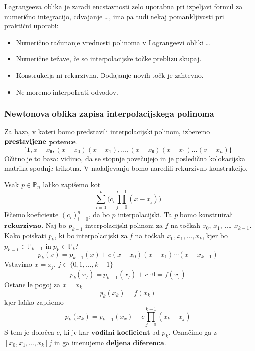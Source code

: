 \documentclass[a4paper,12pt]{article}
\theoremstyle{definition}
\theoremstyle{remark}
\newcommand{\Pp}{\mathbb{P}}
\begin{document}
Lagrangeeva oblika je zaradi enostavnosti zelo uporabna pri izpeljavi formul za numerično integracijo, odvajanje \dots, ima pa tudi nekaj pomankljivosti pri praktični uporabi:
\begin{itemize}
    \item Numerično računanje vrednosti polinoma v Lagrangeevi obliki \dots
    \item Numerične težave, če so interpolacijske točke preblizu skupaj.
    \item Konstrukcija ni rekurzivna. Dodajanje novih točk je zahtevno.
    \item Ne moremo interpolirati odvodov.
\end{itemize}

\subsubsection{Newtonova oblika zapisa interpolacijskega polinoma}
Za bazo, v kateri bomo predstavili interpolacijski polinom, izberemo $\\ \textbf{prestavljene}$ $\textbf{potence}$. %
\begin{equation*}
    \{1, x-x_0, (x-x_0)(x-x_1), \dots, (x-x_0) (x-x_1) \dots (x-x_n)\}
\end{equation*}
Očitno je to baza: vidimo, da se stopnje povečujejo in je posledično kolokacijska matrika spodnje trikotna. V nadaljevanju bomo naredili rekurzivno konstrukcijo.

Vsak $p \in \Pp_n$ lahko zapišemo kot 
\begin{equation*}
    \sum_{i = 0}^{n} \bigl( c_i \prod_{j = 0}^{i-1} (x-x_j) \bigr)
\end{equation*}
Iščemo koeficiente $(c_i)_{i=0}^n$, da bo $p$ interpolacijski.
Ta $p$ bomo konstruirali $\textbf{rekurzivno}$.
Naj bo $p_{k-1}$ interpolacijski polinom za $f$ na točkah $x_0$, $x_1$, $\dots$, $x_{k-1}$. Kako poiskati $p_k$, ki bo interpolacijski za $f$ na točkah
$x_0, x_1, \dots, x_k$, kjer bo $p_{k-1} \in \Pp_{k-1} \text{ in } p_k \in \Pp_k$?
\begin{equation*}
    p_k (x) = p_{k-1}(x) + c (x-x_0)(x-x_1)\cdots(x-x_{k-1})
\end{equation*}
Vstavimo $x = x_j$, $j \in \{0, 1, \dots, k-1\}$
\begin{equation*}
    p_k(x_j) = p_{k-1}(x_j) + c \cdot 0 = f(x_j)
\end{equation*}
Ostane le pogoj za $x = x_k$
\begin{equation*}
    p_k(x_k) = f(x_k)
\end{equation*}
kjer lahko zapišemo
\begin{equation*}
    p_k(x_k) = p_{k-1}(x_x) +  c \prod_{j = 0}^{k-1}(x_k - x_j)
\end{equation*}
S tem je določen $c$, ki je kar $\textbf{vodilni koeficient}$ od $p_k$. Označimo ga z $[x_0, x_1, \dots, x_k] f$ in ga imenujemo $\textbf{deljena diferenca}$.
\end{document}
